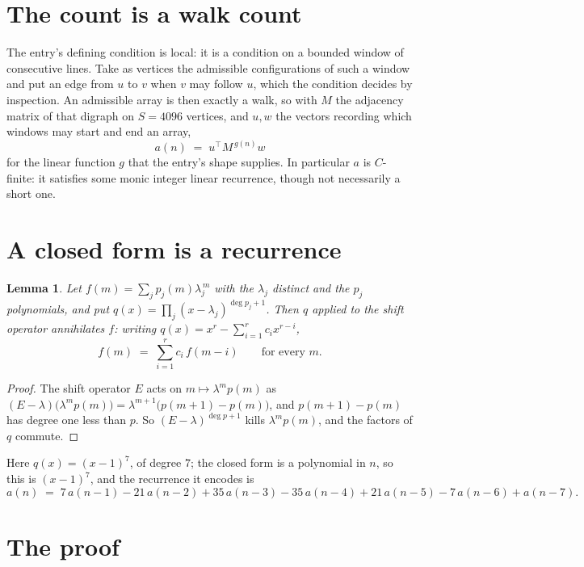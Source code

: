\documentclass[11pt,a4paper]{article}
\theoremstyle{plain}
\newtheorem{lemma}[theorem]{Lemma}
\theoremstyle{definition}
\begin{document}
\section{The count is a walk count}

The entry's defining condition is local: it is a condition on a bounded window of consecutive lines. Take as vertices the
admissible configurations of such a window and put an edge from $u$ to $v$ when $v$ may
follow $u$, which the condition decides by inspection. An admissible array is then exactly a
walk, so with $M$ the adjacency matrix of that digraph on $S=4096$ vertices, and $u,w$ the
vectors recording which windows may start and end an array,
\[
a(n)\;=\;u^{\!\top}M^{\,g(n)}w
\]
for the linear function $g$ that the entry's shape supplies. In particular $a$ is
$C$-finite: it satisfies some monic integer linear recurrence, though not necessarily a short
one.

\section{A closed form is a recurrence}

\begin{lemma}\label{lem:ann}
Let $f(m)=\sum_{j}p_j(m)\lambda_j^{\,m}$ with the $\lambda_j$ distinct and the $p_j$
polynomials, and put $q(x)=\prod_j(x-\lambda_j)^{\deg p_j+1}$. Then $q$ applied to the shift
operator annihilates $f$: writing $q(x)=x^{r}-\sum_{i=1}^{r}c_ix^{r-i}$,
\[
f(m)\;=\;\sum_{i=1}^{r}c_i\,f(m-i)\qquad\text{for every }m.
\]
\end{lemma}

\begin{proof}
The shift operator $E$ acts on $m\mapsto\lambda^{m}p(m)$ as
$(E-\lambda)\bigl(\lambda^{m}p(m)\bigr)=\lambda^{m+1}\bigl(p(m+1)-p(m)\bigr)$, and
$p(m+1)-p(m)$ has degree one less than $p$. So $(E-\lambda)^{\deg p+1}$ kills
$\lambda^{m}p(m)$, and the factors of $q$ commute.
\end{proof}

Here $q(x)=(x-1)^{7}$, of degree $7$; the closed form is a polynomial in $n$, so this is $(x-1)^{7}$, and the recurrence it encodes is
\begin{equation}\label{eq:rec}
a(n)\;=\;7\,a(n-1) - 21\,a(n-2) + 35\,a(n-3) - 35\,a(n-4) + 21\,a(n-5) - 7\,a(n-6) + a(n-7).
\end{equation}

\section{The proof}
\end{document}
